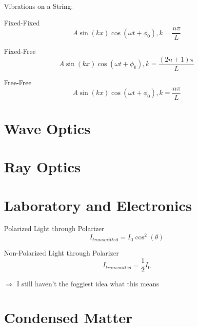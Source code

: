 \documentclass{article}
\begin{document}
Vibrations on a String:

Fixed-Fixed\begin{equation}A\sin(kx)\cos(\omega t + \phi_0), k = \frac{n\pi}{L}\end{equation}

Fixed-Free\begin{equation}A\sin(kx)\cos(\omega t+\phi_0), k = \frac{(2n+1)\pi}{L}\end{equation}

Free-Free\begin{equation}A\sin(kx)\cos(\omega t + \phi_0), k= \frac{n\pi}{L}\end{equation}


\section{Wave Optics}










\section{Ray Optics}









\section{Laboratory and Electronics}
Polarized Light through Polarizer\begin{equation}I_{transmitted} = I_0\cos^2(\theta)\end{equation}

Non-Polarized Light through Polarizer\begin{equation}I_{transmitted}=\frac{1}{2}I_0\end{equation}

$\Rightarrow$ I still haven't the foggiest idea what this means








\section{Condensed Matter}
\end{document}
